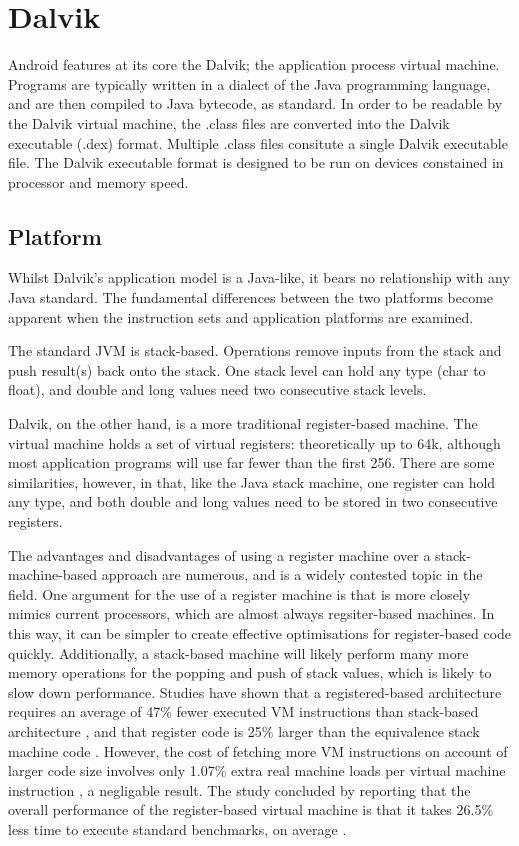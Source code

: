 \section{Dalvik}
\label{sec:dalvik}

Android features at its core the Dalvik; the application process virtual machine. Programs are typically written in a dialect of the Java programming language, and are then compiled to Java bytecode, as standard. In order to be readable by the Dalvik virtual machine, the .class files are converted into the Dalvik executable (.dex) format. Multiple .class files consitute a single Dalvik executable file. The Dalvik executable format is designed to be run on devices constained in processor and memory speed.

\subsection*{Platform}

Whilst Dalvik's application model is a Java-like, it bears no relationship with any Java standard. The fundamental differences between the two platforms become apparent when the instruction sets and application platforms are examined.

The standard JVM is stack-based. Operations remove inputs from the stack and push result(s) back onto the stack. One stack level can hold any type (char to float), and double and long values need two consecutive stack levels.

Dalvik, on the other hand, is a more traditional register-based machine. The virtual machine holds a set of virtual registers: theoretically up to 64k, although most application programs will use far fewer than the first 256. There are some similarities, however, in that, like the Java stack machine, one register can hold any type, and both double and long values need to be stored in two consecutive registers.

The advantages and disadvantages of using a register machine over a stack-machine-based approach are numerous, and is a widely contested topic in the field. One argument for the use of a register machine is that is more closely mimics current processors, which are almost always regsiter-based machines. In this way, it can be simpler to create effective optimisations for register-based code quickly. Additionally, a stack-based machine will likely perform many more memory operations for the popping and push of stack values, which is likely to slow down performance. Studies have shown that a registered-based architecture requires an average of 47\% fewer executed VM instructions than stack-based architecture \cite{vmshowdown}, and that register code is 25\% larger than the equivalence stack machine code \cite{vmshowdown}. However, the cost of fetching more VM instructions on account of larger code size involves only 1.07\% extra real machine loads per virtual machine instruction \cite{vmshowdown}, a negligable result. The study concluded by reporting that the overall performance of the register-based virtual machine is that it takes 26.5\% less time to execute standard benchmarks, on average \cite{vmshowdown}.

